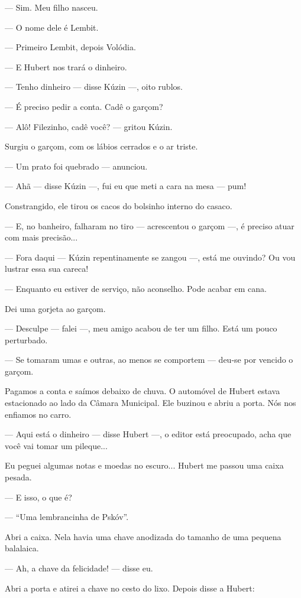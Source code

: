 --- Sim. Meu filho nasceu.

--- O nome dele é Lembit.

--- Primeiro Lembit, depois Volódia.

--- E Hubert nos trará o dinheiro.

--- Tenho dinheiro --- disse Kúzin ---, oito rublos.

--- É preciso pedir a conta. Cadê o garçom?

--- Alô! Filezinho, cadê você? --- gritou Kúzin.

Surgiu o garçom, com os lábios cerrados e o ar triste.

--- Um prato foi quebrado --- anunciou.

--- Ahã --- disse Kúzin ---, fui eu que meti a cara na mesa --- pum!

Constrangido, ele tirou os cacos do bolsinho interno do casaco.

--- E, no banheiro, falharam no tiro --- acrescentou o garçom ---, é
preciso atuar com mais precisão...

--- Fora daqui --- Kúzin repentinamente se zangou ---, está me ouvindo?
Ou vou lustrar essa sua careca!

--- Enquanto eu estiver de serviço, não aconselho. Pode acabar em cana.

Dei uma gorjeta ao garçom.

--- Desculpe --- falei ---, meu amigo acabou de ter um filho. Está um
pouco perturbado.

--- Se tomaram umas e outras, ao menos se comportem --- deu-se por
vencido o garçom.

Pagamos a conta e saímos debaixo de chuva. O automóvel de Hubert estava
estacionado ao lado da Câmara Municipal. Ele buzinou e abriu a porta.
Nós nos enfiamos no carro.

--- Aqui está o dinheiro --- disse Hubert ---, o editor está preocupado,
acha que você vai tomar um pileque...

Eu peguei algumas notas e moedas no escuro... Hubert me passou uma caixa
pesada.

--- E isso, o que é?

--- ``Uma lembrancinha de Pskóv''.

Abri a caixa. Nela havia uma chave anodizada do tamanho de uma pequena
balalaica.

--- Ah, a chave da felicidade! --- disse eu.

Abri a porta e atirei a chave no cesto do lixo. Depois disse a Hubert:

